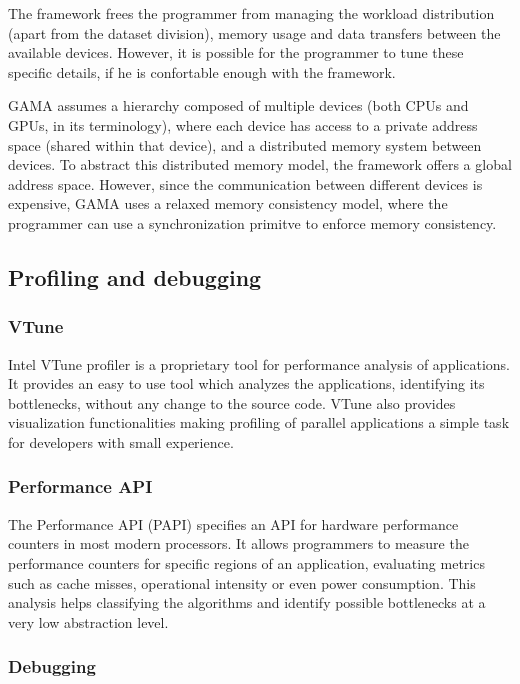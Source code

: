 The framework frees the programmer from managing the workload distribution (apart from the dataset division), memory usage and data transfers between the available devices. However, it is possible for the programmer to tune these specific details, if he is confortable enough with the framework.

GAMA assumes a hierarchy composed of multiple devices (both CPUs and GPUs, in its terminology), where each device has access to a private address space (shared within that device), and a distributed memory system between devices. To abstract this distributed memory model, the framework offers a global address space. However, since the communication between different devices is expensive, GAMA uses a relaxed memory consistency model, where the programmer can use a synchronization primitve to enforce memory consistency.

\subsection{Profiling and debugging}
\label{ProfilingDebugging}

\subsubsection*{VTune}
\label{VTune}

Intel VTune profiler \cite{Intel:VTune} is a proprietary tool for performance analysis of applications. It provides an easy to use tool which analyzes the applications, identifying its bottlenecks, without any change to the source code. VTune also provides visualization functionalities making profiling of parallel applications a simple task for developers with small experience.

\subsubsection*{Performance API}
\label{PAPI}

The Performance API (PAPI) \cite{PAPI} specifies an API for hardware performance counters in most modern processors. It allows programmers to measure the performance counters for specific regions of an application, evaluating metrics such as cache misses, operational intensity or even power consumption. This analysis helps classifying the algorithms and identify possible bottlenecks at a very low abstraction level.

\subsubsection*{Debugging}
\label{Debugging}

